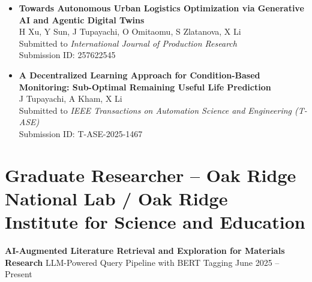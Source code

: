 \documentclass[10pt, letterpaper]{article}
\newenvironment{twocolentry}[2][]{
    \onecolentry
    \def\secondColumn{#2}
    \setcolumnwidth{\fill, 4.5 cm}
    \begin{paracol}{2}
}{
    \switchcolumn \raggedleft \secondColumn
    \end{paracol}
    \endonecolentry
} %
\begin{document}
\begin{itemize}[left=0pt] 

    \item \textbf{Towards Autonomous Urban Logistics Optimization via Generative AI and Agentic Digital Twins} \\
    H Xu, Y Sun, J Tupayachi, O Omitaomu, S Zlatanova, X Li \\
    Submitted to \textit{International Journal of Production Research} \\
    Submission ID: 257622545 \\

    \item \textbf{A Decentralized Learning Approach for Condition-Based Monitoring: Sub-Optimal Remaining Useful Life Prediction} \\
    J Tupayachi, A Kham, X Li \\
    Submitted to \textit{IEEE Transactions on Automation Science and Engineering (T-ASE)} \\
    Submission ID: T-ASE-2025-1467 \\

\end{itemize}

    
\section*{Graduate Researcher – Oak Ridge National Lab / Oak Ridge Institute for Science and Education}
\small

\vspace{0.3cm} \begin{twocolentry}{June 2025 – Present} \textbf{AI-Augmented Literature Retrieval and Exploration for Materials Research} \textbar LLM-Powered Query Pipeline with BERT Tagging \end{twocolentry}
\end{document}
